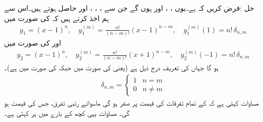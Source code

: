 حل :فرض کریں کہ  ہے۔یوں ، ،  اور  ہوں گے جن  سے ، ، ،  اور  حاصل ہوتے ہیں۔اس سے ہم اخذ کرتے ہیں کہ  کی صورت میں
\begin{align}\label{مساوات_بیسل_سوال_عمومی_الف}
y_1=(x-1)^n,\quad y_1^{(m)}=\frac{n!}{(n-m)!}(x-1)^{n-m},\quad y_1^{(m)}(1)=n! \,\delta_{n,m}
\end{align}
اور  کی صورت میں
\begin{align}\label{مساوات_بیسل_سوال_عمومی_ب}
y_2=(x-1)^n,\quad y_2^{(m)}=\frac{n!}{(n-m)!}(x+1)^{n-m},\quad y_2^{(m)}(-1)=n! \,\delta_{n,m}
\end{align}
ہو گا جہاں  کی تعریف درج ذیل ہے (یعنی  کی صورت میں  جبکہ  کی صورت میں  ہے)۔ 
\begin{align}\label{مساوات_بیسل_کرونیکر_الف}
\delta_{n,m}=
\begin{cases}
1& n=m\\
0&n \ne m
\end{cases}
\end{align}
مساوات  کہتی ہے کہ  کے تمام تفرقات کی قیمت  پر صفر ہو گی ماسوائے  رتبی تفرق، جس کی قیمت  ہو گی۔  مساوات  یہی کچھ  کے بارے میں  پر کہتی ہے۔

